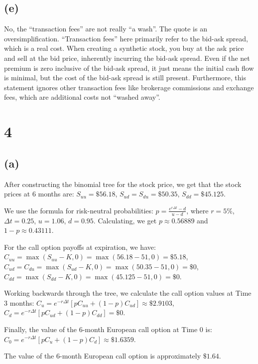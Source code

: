 \subsection{(e)}\label{e}

No, the ``transaction fees'' are not really ``a wash''. The quote is an
oversimplification. ``Transaction fees'' here primarily refer to the
bid-ask spread, which is a real cost. When creating a synthetic stock,
you buy at the ask price and sell at the bid price, inherently incurring
the bid-ask spread. Even if the net premium is zero inclusive of the
bid-ask spread, it just means the initial cash flow is minimal, but the
cost of the bid-ask spread is still present. Furthermore, this statement
ignores other transaction fees like brokerage commissions and exchange
fees, which are additional costs not ``washed away''.

    \section{4}\label{section}

    \subsection{(a)}\label{a}

After constructing the binomial tree for the stock price, we get that
the stock prices at 6 months are: \(S_{uu} = \$56.18\),
\(S_{ud} = S_{du} = \$50.35\), \(S_{dd} = \$45.125\).

We use the formula for risk-neutral probabilities:
\(p = \frac{e^{r\Delta t} - d}{u - d}\), where \(r = 5\%\),
\(\Delta t = 0.25\), \(u = 1.06\), \(d = 0.95\). Calculating, we get
\(p \approx 0.56889\) and \(1-p \approx 0.43111\).

For the call option payoffs at expiration, we have:
\(C_{uu} = \max(S_{uu} - K, 0) = \max(56.18 - 51, 0) = \$5.18\),
\(C_{ud} = C_{du} = \max(S_{ud} - K, 0) = \max(50.35 - 51, 0) = \$0\),
\(C_{dd} = \max(S_{dd} - K, 0) = \max(45.125 - 51, 0) = \$0\).

Working backwards through the tree, we calculate the call option values
at Time 3 months:
\(C_u = e^{-r\Delta t} [p C_{uu} + (1-p) C_{ud}] \approx \$2.9103\),
\(C_d = e^{-r\Delta t} [p C_{ud} + (1-p) C_{dd}] = \$0\).

Finally, the value of the 6-month European call option at Time 0 is:
\(C_0 = e^{-r\Delta t} [p C_u + (1-p) C_d] \approx \$1.6359\).

The value of the 6-month European call option is approximately
\(\boxed{\$1.64}\).

